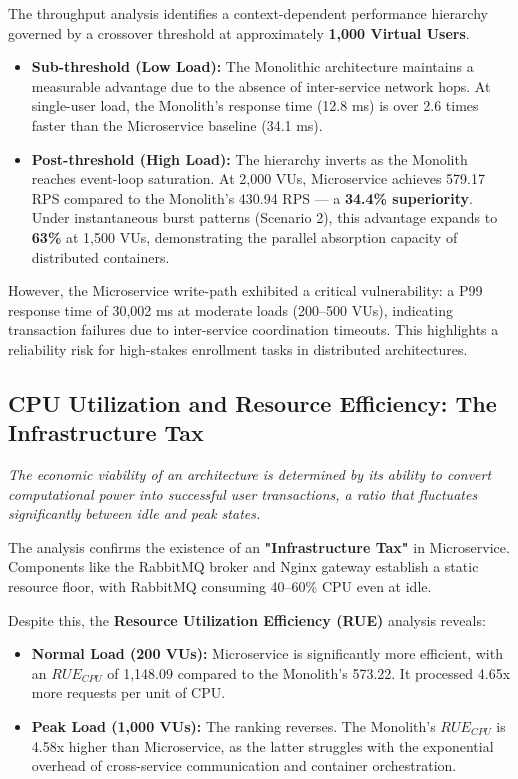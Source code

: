 The throughput analysis identifies a context-dependent performance hierarchy governed by a crossover threshold at approximately \textbf{1,000 Virtual Users}. 
\begin{itemize}
    \item \textbf{Sub-threshold (Low Load):} The Monolithic architecture maintains a measurable advantage due to the absence of inter-service network hops. At single-user load, the Monolith's response time (12.8 ms) is over 2.6 times faster than the Microservice baseline (34.1 ms).
    \item \textbf{Post-threshold (High Load):} The hierarchy inverts as the Monolith reaches event-loop saturation. At 2,000 VUs, Microservice achieves 579.17 RPS compared to the Monolith’s 430.94 RPS — a \textbf{34.4\% superiority}. Under instantaneous burst patterns (Scenario 2), this advantage expands to \textbf{63\%} at 1,500 VUs, demonstrating the parallel absorption capacity of distributed containers.
\end{itemize}

However, the Microservice write-path exhibited a critical vulnerability: a P99 response time of 30,002 ms at moderate loads (200--500 VUs), indicating transaction failures due to inter-service coordination timeouts. This highlights a reliability risk for high-stakes enrollment tasks in distributed architectures.

\subsection{CPU Utilization and Resource Efficiency: The Infrastructure Tax}
\textit{The economic viability of an architecture is determined by its ability to convert computational power into successful user transactions, a ratio that fluctuates significantly between idle and peak states.}

The analysis confirms the existence of an \textbf{"Infrastructure Tax"} in Microservice. Components like the RabbitMQ broker and Nginx gateway establish a static resource floor, with RabbitMQ consuming 40--60\% CPU even at idle. 

Despite this, the \textbf{Resource Utilization Efficiency (RUE)} analysis reveals:
\begin{itemize}
    \item \textbf{Normal Load (200 VUs):} Microservice is significantly more efficient, with an $RUE_{CPU}$ of 1,148.09 compared to the Monolith’s 573.22. It processed 4.65x more requests per unit of CPU.
    \item \textbf{Peak Load (1,000 VUs):} The ranking reverses. The Monolith’s $RUE_{CPU}$ is 4.58x higher than Microservice, as the latter struggles with the exponential overhead of cross-service communication and container orchestration.
\end{itemize}


